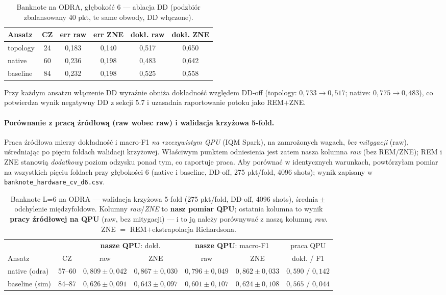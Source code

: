 \documentclass[11pt,a4paper]{article}
\begin{document}
\begin{table}[htbp]
\centering
\caption{Banknote na ODRA, głębokość 6 --- ablacja DD (podzbiór zbalansowany 40 pkt,
te same obwody, DD włączone).}
\begin{tabular}{@{}lc cc cc@{}}
\toprule
Ansatz & CZ & err raw & err ZNE & dokł. raw & dokł. ZNE \\
\midrule
topology & 24 & 0,183 & 0,140 & 0,517 & 0,650 \\
native   & 60 & 0,236 & 0,198 & 0,483 & 0,642 \\
baseline & 84 & 0,232 & 0,198 & 0,525 & 0,558 \\
\bottomrule
\end{tabular}
\end{table}

\noindent Przy każdym ansatzu włączenie DD wyraźnie obniża dokładność względem DD-off
(topology: $0{,}733\to0{,}517$; native: $0{,}775\to0{,}483$), co potwierdza wynik negatywny
DD z sekcji 5.7 i uzasadnia raportowanie potoku jako REM${+}$ZNE.

\paragraph{Porównanie z pracą źródłową (raw wobec raw) i walidacja krzyżowa 5-fold.}
Praca źródłowa mierzy dokładność i macro-F1 \emph{na rzeczywistym QPU} (IQM Spark), na
zamrożonych wagach, \emph{bez mitygacji} (raw), uśredniając po pięciu foldach walidacji
krzyżowej. Właściwym punktem odniesienia jest zatem nasza kolumna \emph{raw} (bez REM/ZNE);
REM i ZNE stanowią \emph{dodatkowy} poziom odzysku ponad tym, co raportuje praca. Aby
porównać w identycznych warunkach, powtórzyłam pomiar na wszystkich pięciu foldach przy
głębokości 6 (native i baseline, DD-off, 275 pkt/fold, 4096 shots); wynik zapisany w
\texttt{banknote\_hardware\_cv\_d6.csv}.

\begin{table}[htbp]
\centering
\caption{Banknote L=6 na ODRA --- walidacja krzyżowa 5-fold (275 pkt/fold, DD-off, 4096 shots),
średnia${}\pm{}$odchylenie międzyfoldowe. Kolumny \emph{raw}/\emph{ZNE} to \textbf{nasz pomiar
QPU}; ostatnia kolumna to wynik \textbf{pracy źródłowej na QPU} (raw, bez mitygacji) ---
i to ją należy porównywać z naszą kolumną \emph{raw}. ZNE ${}={}$ REM${+}$ekstrapolacja Richardsona.}
\label{tab:bank-qpu-cv}
\begin{tabular}{@{}lc cc cc c@{}}
\toprule
& & \multicolumn{2}{c}{\textbf{nasze QPU}: dokł.} & \multicolumn{2}{c}{\textbf{nasze QPU}: macro-F1} & praca QPU \\
\cmidrule(lr){3-4}\cmidrule(lr){5-6}
Ansatz & CZ & raw & ZNE & raw & ZNE & dokł. / F1 \\
\midrule
native (odra)  & 57--60 & $0{,}809\pm0{,}042$ & $0{,}867\pm0{,}030$ & $0{,}796\pm0{,}049$ & $0{,}862\pm0{,}033$ & $0{,}590$ / $0{,}142$ \\
baseline (sim) & 84--87 & $0{,}626\pm0{,}091$ & $0{,}643\pm0{,}097$ & $0{,}601\pm0{,}107$ & $0{,}624\pm0{,}108$ & $0{,}565$ / $0{,}044$ \\
\bottomrule
\end{tabular}
\end{table}
\end{document}
